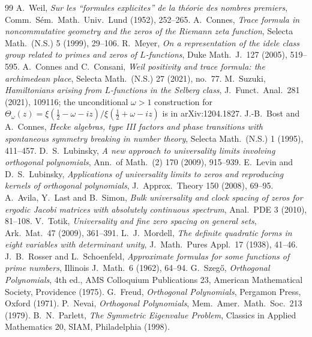 \documentclass[11pt,a4paper]{article}
\theoremstyle{remark}
\begin{document}
\small
\begin{thebibliography}{99}
 A.~Weil,
\emph{Sur les ``formules explicites'' de la th\'eorie des nombres
premiers}, Comm.\ S\'em.\ Math.\ Univ.\ Lund (1952), 252--265.
 A.~Connes,
\emph{Trace formula in noncommutative geometry and the zeros of the
Riemann zeta function}, Selecta Math.\ (N.S.) 5 (1999), 29--106.
 R.~Meyer,
\emph{On a representation of the idele class group related to primes
and zeros of $L$-functions}, Duke Math.\ J.\ 127 (2005), 519--595.
 A.~Connes and C.~Consani,
\emph{Weil positivity and trace formula: the archimedean place},
Selecta Math.\ (N.S.) 27 (2021), no.~77.
 M.~Suzuki,
\emph{Hamiltonians arising from $L$-functions in the Selberg class},
J.\ Funct.\ Anal.\ 281 (2021), 109116; the unconditional
$\omega>1$ construction for $\Theta_\omega(z)=
\xi(\tfrac12-\omega-iz)/\xi(\tfrac12+\omega-iz)$ is in
arXiv:1204.1827.
 J.-B.~Bost and A.~Connes,
\emph{Hecke algebras, type III factors and phase transitions with
spontaneous symmetry breaking in number theory},
Selecta Math.\ (N.S.) 1 (1995), 411--457.
 D.~S.~Lubinsky,
\emph{A new approach to universality limits involving orthogonal
polynomials}, Ann.\ of Math.\ (2) 170 (2009), 915--939.
 E.~Levin and D.~S.~Lubinsky,
\emph{Applications of universality limits to zeros and reproducing
kernels of orthogonal polynomials}, J.\ Approx.\ Theory 150 (2008),
69--95.
 A.~Avila, Y.~Last and B.~Simon,
\emph{Bulk universality and clock spacing of zeros for ergodic Jacobi
matrices with absolutely continuous spectrum}, Anal.\ PDE 3 (2010),
81--108.
 V.~Totik,
\emph{Universality and fine zero spacing on general sets},
Ark.\ Mat.\ 47 (2009), 361--391.
 L.~J.~Mordell,
\emph{The definite quadratic forms in eight variables with
determinant unity}, J.\ Math.\ Pures Appl.\ 17 (1938), 41--46.
 J.~B.~Rosser and L.~Schoenfeld,
\emph{Approximate formulas for some functions of prime numbers},
Illinois J.\ Math.\ 6 (1962), 64--94.
 G.~Szeg\H o,
\emph{Orthogonal Polynomials}, 4th ed., AMS Colloquium Publications
23, American Mathematical Society, Providence (1975).
 G.~Freud,
\emph{Orthogonal Polynomials}, Pergamon Press, Oxford (1971).
 P.~Nevai,
\emph{Orthogonal Polynomials}, Mem.\ Amer.\ Math.\ Soc.\ 213 (1979).
 B.~N.~Parlett,
\emph{The Symmetric Eigenvalue Problem}, Classics in Applied
Mathematics 20, SIAM, Philadelphia (1998).

\end{thebibliography}
\end{document}

